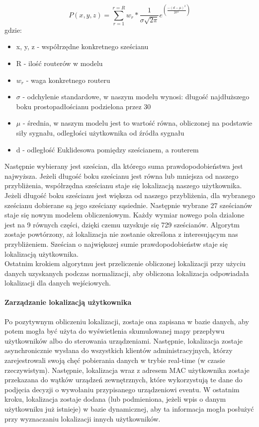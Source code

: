 \documentclass{article}
\begin{document}
		\begin{equation}
			P(x,y,z) = \sum_{r=1}^{r=R} w_r * \frac{1}{\sigma\sqrt{2\pi}}e^{\left(\frac{-(d-\mu)^2}{2\sigma^2}\right)}
		\end{equation}
		gdzie:
		\begin{itemize}
			\item x, y, z - współrzędne konkretnego sześcianu
			\item R - ilość routerów w modelu
			\item $w_r$ - waga konkretnego routeru
			\item $\sigma$ - odchylenie standardowe, w naszym modelu wynosi: długość najdłuższego boku prostopadłościanu podzielona przez 30
			\item $\mu$ - średnia, w naszym modelu jest to wartość równa, obliczonej na podstawie siły sygnału, odległości użytkownika od źródła sygnału
			\item d - odległość Euklidesowa pomiędzy sześcianem, a routerem
		\end{itemize}
		Następnie wybierany jest sześcian, dla którego suma prawdopodobieństwa jest najwyższa. Jeżeli długość boku sześcianu jest równa lub mniejsza od naszego przybliżenia, współrzędna sześcianu staje się lokalizacją naszego użytkownika. Jeżeli długość boku sześcianu jest większa od naszego przybliżenia, dla wybranego sześcianu dobierane są jego sześciany sąsiednie. Następnie wybrane 27 sześcianów staje się nowym modelem obliczeniowym. Każdy wymiar nowego pola dzialone jest na 9 równych części, dzięki czemu uzyskuje się 729 sześcianów. Algorytm zostaje powtórzony, aż lokalizacja nie zostanie określona z interesującym nas przybliżeniem. Sześcian o największej sumie prawdopodobieństw staje się lokalizacją użytkownika.\\
		Ostatnim krokiem algorytmu jest przeliczenie obliczonej lokalizacji przy użyciu danych uzyskanych podczas normalizacji, aby obliczona lokalizacja odpowiadała lokalizacji dla danych wejściowych.
		\paragraph{Zarządzanie lokalizacją użytkownika}
		Po pozytywnym obliczeniu lokalizacji, zostaje ona zapisana w bazie danych, aby potem mogła być użyta do wyświetlenia skumulowanej mapy przepływu użytkowników albo do sterowania urządzeniami. Następnie, lokalizacja zostaje asynchronicznie wysłana do wszystkich klientów administracyjnych, którzy zarejestrowali swoją chęć pobierania danych w trybie real-time (w czasie rzeczywistym). Następnie, lokalizacja wraz z adresem MAC użytkownika zostaje przekazana do wątków urządzeń zewnętrznych, które wykorzystują te dane do podjęcia decyzji o wywołaniu przypisanego urządzeniowi eventu. W ostatnim kroku, lokalizacja zostaje dodana (lub podmieniona, jeżeli wpis o danym użytkowniku już istnieje) w bazie dynamicznej, aby ta informacja mogła posłużyć przy wyznaczaniu lokalizacji innych użytkowników.
\end{document}

